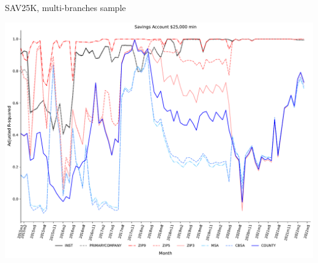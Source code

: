 \documentclass{beamer}
\begin{document}
\begin{frame}{SAV25K, multi-branches sample}
\begin{center}
\includegraphics[width=1\textwidth]{figure/multi_branch_sample_932466/all_fixed_effects/SAV25K_adjusted_R2_all_fixed_effects.pdf} 
\end{center}
\end{frame}
\end{document}
